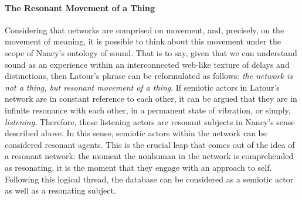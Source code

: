 


\paragraph{The Resonant Movement of a Thing}
Considering that networks are comprised on movement, and, precisely, on the movement of meaning, it is possible to think about this movement under the scope of Nancy's ontology of sound. That is to say, given that we can understand sound as an experience within an interconnected web-like texture of delays and distinctions, then Latour's phrase can be reformulated as follows: \textit{the network is not a thing, but resonant movement of a thing}. If semiotic actors in Latour's network are in constant reference to each other, it can be argued that they are in infinite resonance with each other, in a permanent state of vibration, or simply, \textit{listening}. Therefore, these listening actors are resonant subjects in Nancy's sense described above. In this sense, semiotic actors within the network can be considered resonant agents. This is the crucial leap that comes out of the idea of a resonant network: the moment the nonhuman in the network is comprehended as resonating, it is the moment that they engage with an approach to self. Following this logical thread, the database can be considered as a semiotic actor as well as a resonating subject. 





